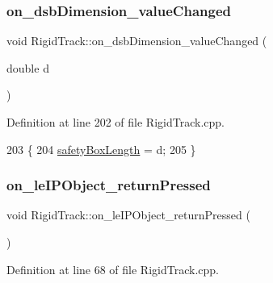 \subsubsection{\texorpdfstring{on\+\_\+dsb\+Dimension\+\_\+value\+Changed}{on\_dsbDimension\_valueChanged}}
{\footnotesize\ttfamily void Rigid\+Track\+::on\+\_\+dsb\+Dimension\+\_\+value\+Changed (\begin{DoxyParamCaption}\item[{double}]{d }\end{DoxyParamCaption})\hspace{0.3cm}{\ttfamily [slot]}}



Definition at line 202 of file Rigid\+Track.\+cpp.


\begin{DoxyCode}
203 \{
204     \hyperlink{main_8cpp_a2c1b807fcb2de5a6759bd60ccae6dd7e}{safetyBoxLength} = d;
205 \}
\end{DoxyCode}
\mbox{\label{class_rigid_track_a9f037a061b2577815fc80e5e9f8d46d9}} 
\subsubsection{\texorpdfstring{on\+\_\+le\+I\+P\+Object\+\_\+return\+Pressed}{on\_leIPObject\_returnPressed}}
{\footnotesize\ttfamily void Rigid\+Track\+::on\+\_\+le\+I\+P\+Object\+\_\+return\+Pressed (\begin{DoxyParamCaption}{ }\end{DoxyParamCaption})\hspace{0.3cm}{\ttfamily [slot]}}



Definition at line 68 of file Rigid\+Track.\+cpp.


